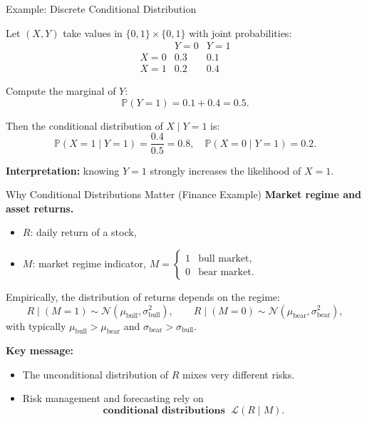 \documentclass[aspectratio=169]{beamer}
\begin{document}
\begin{frame}{Example: Discrete Conditional Distribution}

Let \((X,Y)\) take values in \(\{0,1\}\times\{0,1\}\) with joint probabilities:\pause
\[
\begin{array}{c|cc}
 & Y=0 & Y=1 \\ \hline
X=0 & 0.3 & 0.1 \\
X=1 & 0.2 & 0.4
\end{array}
\]
\pause
\medskip

Compute the marginal of \(Y\):
\[
\mathbb{P}(Y=1)=0.1+0.4=0.5.
\]
\pause
\medskip

Then the conditional distribution of \(X\mid Y=1\) is:
\[
\mathbb{P}(X=1\mid Y=1)=\frac{0.4}{0.5}=0.8,
\quad
\mathbb{P}(X=0\mid Y=1)=0.2.
\]\pause

\medskip

\textbf{Interpretation:}
knowing \(Y=1\) strongly increases the likelihood of \(X=1\).

\end{frame}

\begin{frame}{Why Conditional Distributions Matter (Finance Example)}
\pause
\textbf{Market regime and asset returns.}
\pause
\begin{itemize}
  \item \(R\): daily return of a stock,\pause
  \item \(M\): market regime indicator,\pause
  $
  M =
  \begin{cases}
  1 & \text{bull market},\\
  0 & \text{bear market}.
  \end{cases}
  $
\end{itemize}
\pause
\medskip

Empirically, the distribution of returns depends on the regime:\pause
\[
R \mid (M=1) \sim \mathcal{N}(\mu_{\text{bull}},\sigma_{\text{bull}}^2),
\qquad
R \mid (M=0) \sim \mathcal{N}(\mu_{\text{bear}},\sigma_{\text{bear}}^2),
\]
with typically \(\mu_{\text{bull}}>\mu_{\text{bear}}\) and
\(\sigma_{\text{bear}}>\sigma_{\text{bull}}\).
\pause
\medskip

\textbf{Key message:}
\begin{itemize}
  \item The unconditional distribution of \(R\) mixes very different risks.\pause
  \item Risk management and forecasting rely on
  \[
  \textbf{conditional distributions } \; \mathcal{L}(R \mid M).
  \]\pause
\end{itemize}


\end{frame}
\end{document}
